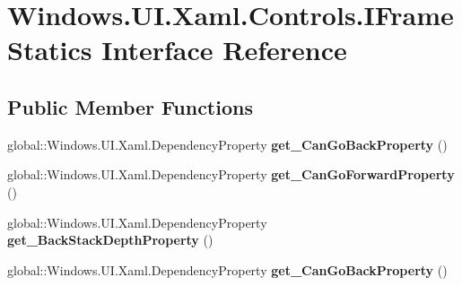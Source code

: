 \hypertarget{interface_windows_1_1_u_i_1_1_xaml_1_1_controls_1_1_i_frame_statics}{}\section{Windows.\+U\+I.\+Xaml.\+Controls.\+I\+Frame\+Statics Interface Reference}
\label{interface_windows_1_1_u_i_1_1_xaml_1_1_controls_1_1_i_frame_statics}
\subsection*{Public Member Functions}
\begin{DoxyCompactItemize}
\item 
\mbox{\label{interface_windows_1_1_u_i_1_1_xaml_1_1_controls_1_1_i_frame_statics_ab9ef06194fcc3f0ac0fe148b9708b5a2}} 
global\+::\+Windows.\+U\+I.\+Xaml.\+Dependency\+Property {\bfseries get\+\_\+\+Can\+Go\+Back\+Property} ()
\item 
\mbox{\label{interface_windows_1_1_u_i_1_1_xaml_1_1_controls_1_1_i_frame_statics_a702820de0c4191e80538e6ccaa2807a4}} 
global\+::\+Windows.\+U\+I.\+Xaml.\+Dependency\+Property {\bfseries get\+\_\+\+Can\+Go\+Forward\+Property} ()
\item 
\mbox{\label{interface_windows_1_1_u_i_1_1_xaml_1_1_controls_1_1_i_frame_statics_ab70bb623eafe2acb9e5726f24c2a7b97}} 
global\+::\+Windows.\+U\+I.\+Xaml.\+Dependency\+Property {\bfseries get\+\_\+\+Back\+Stack\+Depth\+Property} ()
\item 
\mbox{\label{interface_windows_1_1_u_i_1_1_xaml_1_1_controls_1_1_i_frame_statics_ab9ef06194fcc3f0ac0fe148b9708b5a2}} 
global\+::\+Windows.\+U\+I.\+Xaml.\+Dependency\+Property {\bfseries get\+\_\+\+Can\+Go\+Back\+Property} ()
\item 
\mbox{\label{interface_windows_1_1_u_i_1_1_xaml_1_1_controls_1_1_i_frame_statics_a702820de0c4191e80538e6ccaa2807a4}} 

\end{DoxyCompactItemize}
